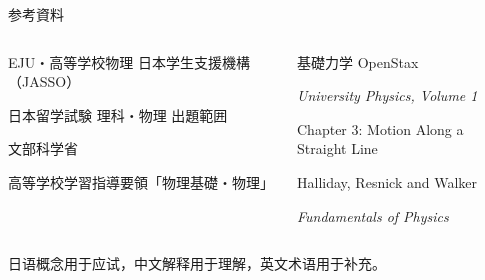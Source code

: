 \documentclass[notheorems,aspectratio=169]{beamer}
\begin{document}
\begin{frame}{参考資料}
  \small
  \begin{columns}[T,onlytextwidth]
    \begin{block}{EJU・高等学校物理}
      日本学生支援機構（JASSO）
      \par 日本留学試験 理科・物理 出題範囲
      \vspace{0.5em}

      文部科学省
      \par 高等学校学習指導要領「物理基礎・物理」
    \end{block}
    \begin{alertblock}{基礎力学}
      OpenStax
      \par \emph{University Physics, Volume 1}
      \par Chapter 3: Motion Along a Straight Line
      \vspace{0.5em}

      Halliday, Resnick and Walker
      \par \emph{Fundamentals of Physics}
    \end{alertblock}
  \end{columns}
  \vfill
  \centering
  {
    \footnotesize 日语概念用于应试，中文解释用于理解，英文术语用于补充。
  }
\end{frame}
\end{document}
